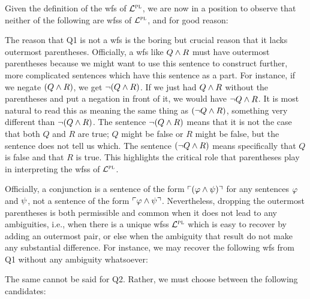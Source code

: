 Given the definition of the wfs of $\mathcal{L}^{\textsc{pl}}$, we are now in a position to observe that neither of the following are wfss of $\mathcal{L}^{\textsc{pl}}$, and for good reason:

\begin{earg}
\end{earg}

The reason that Q1 is not a wfs is the boring but crucial reason that it lacks outermost parentheses.
Officially, a wfs like $Q \wedge R$ must have outermost parentheses because we might want to use this sentence to construct further, more complicated sentences which have this sentence as a part. 
For instance, if we negate $(Q \wedge R)$, we get $\neg(Q \wedge R)$.
If we just had $Q \wedge R$ without the parentheses and put a negation in front of it, we would have $\neg Q \wedge R$.
It is most natural to read this as meaning the same thing as $(\neg Q \wedge R)$, something very different than $\neg(Q\wedge R)$.
The sentence $\neg(Q \wedge R)$ means that it is not the case that both $Q$ and $R$ are true; $Q$ might be false or $R$ might be false, but the sentence does not tell us which.
The sentence $(\neg Q \wedge R)$ means specifically that $Q$ is false and that $R$ is true.
This highlights the critical role that parentheses play in interpreting the wfss of $\mathcal{L}^{\textsc{pl}}$.


Officially, a conjunction is a sentence of the form $\ulcorner(\varphi \wedge \psi)\urcorner$ for any sentences $\varphi$ and $\psi$, not a sentence of the form $\ulcorner\varphi \wedge \psi\urcorner$.
Nevertheless, dropping the outermost parentheses is both permissible and common when it does not lead to any ambiguities, i.e., when there is a unique wfss $\mathcal{L}^{\textsc{pl}}$ which is easy to recover by adding an outermost pair, or else when the ambiguity that result do not make any substantial difference.
For instance, we may recover the following wfs from Q1 without any ambiguity whatsoever:

\begin{earg}
\end{earg}

The same cannot be said for Q2.
Rather, we must choose between the following candidates:

\begin{earg}
\end{earg}

